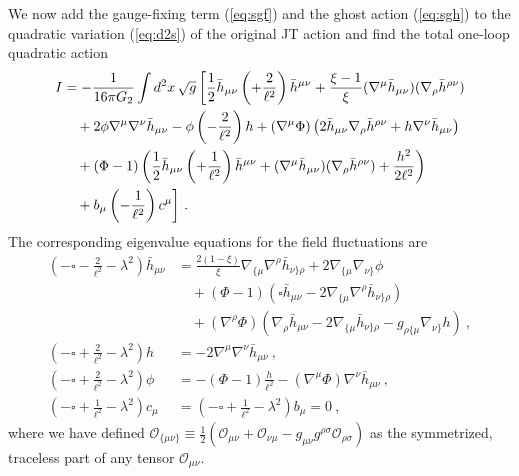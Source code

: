\documentclass[12pt]{article}
\begin{document}
We now add the gauge-fixing term (\ref{eq:sgf}) and the ghost action (\ref{eq:sgh}) to the quadratic variation (\ref{eq:d2s}) of the original JT action and find the total one-loop quadratic action
\begin{equation}\begin{aligned}
	I &= -\frac{1}{16\pi G_2}\int d^2x\,\sqrt{g}\,\bigg{[} \frac{1}{2}\bar{h}_{\mu\nu}\left(\square+\frac{2}{\ell^2}\right) \bar{h}^{\mu\nu} + \frac{\xi - 1}{\xi}(\nabla^\mu \bar{h}_{\mu\nu})(\nabla_\rho \bar{h}^{\rho\nu}) \\
	&\quad + 2 \phi \nabla^\mu \nabla^\nu \bar{h}_{\mu\nu} - \phi \left(\square-\frac{2}{\ell^2}\right) h + (\nabla^\mu \Phi)\left(2 \bar{h}_{\mu\nu}\nabla_\rho \bar{h}^{\rho\nu} + h \nabla^\nu \bar{h}_{\mu\nu}\right) \\
	&\quad + (\Phi - 1)\left(\frac{1}{2}\bar{h}_{\mu\nu}\left(\square+\frac{1}{\ell^2}\right) \bar{h}^{\mu\nu} + (\nabla^\mu \bar{h}_{\mu\nu})(\nabla_\rho \bar{h}^{\rho\nu}) + \frac{h^2}{2\ell^2}\right) \\
	&\quad + b_\mu \left(\square - \frac{1}{\ell^2}\right)c^\mu \bigg{]}~.
\label{eq:squad}
\end{aligned}\end{equation}
The corresponding eigenvalue equations for the field fluctuations are
\begin{equation}\begin{aligned}
	\left(-\square - \frac{2}{\ell^2} - \lambda^2\right) \bar{h}_{\mu\nu} &= \frac{2(1-\xi)}{\xi} \nabla_{\{\mu} \nabla^\rho \bar{h}_{\nu\}\rho} +2\nabla_{\{ \mu} \nabla_{\nu \}} \phi \\
	&\quad + (\Phi-1)\left( \square \bar{h}_{\mu\nu} - 2\nabla_{\{\mu} \nabla^\rho \bar{h}_{\nu\}\rho} \right) \\
	&\quad + (\nabla^\rho \Phi)\left(\nabla_\rho \bar{h}_{\mu\nu} - 2\nabla_{\{\mu}\bar{h}_{\nu\}\rho} - g_{\rho\{\mu} \nabla_{\nu\}} h \right)~, \\
	\left(-\square + \frac{2}{\ell^2} - \lambda^2\right) h &= -2 \nabla^\mu \nabla^\nu \bar{h}_{\mu\nu}~,\\
	\left(-\square + \frac{2}{\ell^2} - \lambda^2\right) \phi &= -(\Phi-1)\frac{h}{\ell^2} - (\nabla^\mu \Phi) \nabla^\nu \bar{h}_{\mu\nu}~, \\
	\left(-\square + \frac{1}{\ell^2} - \lambda^2 \right) c_\mu &= \left(-\square + \frac{1}{\ell^2} - \lambda^2\right) b_\mu = 0~,
\label{eq:quad_eom}
\end{aligned}\end{equation}
where we have defined $\mathcal{O}_{\{\mu\nu\}} \equiv \frac{1}{2}\left(\mathcal{O}_{\mu\nu} + \mathcal{O}_{\nu\mu} - g_{\mu\nu} g^{\rho\sigma}\mathcal{O}_{\rho\sigma}\right)$ as the symmetrized, traceless part of any tensor $\mathcal{O}_{\mu\nu}$.  
\end{document}
